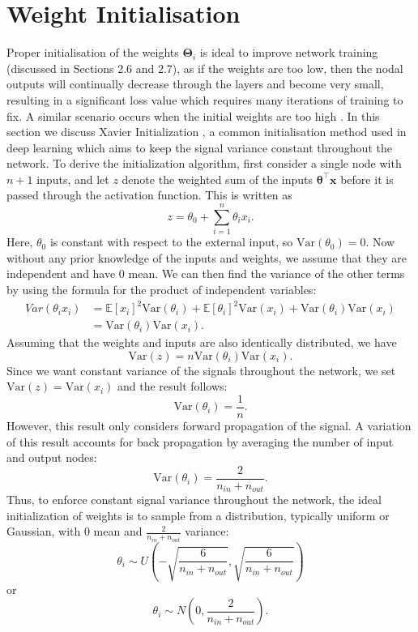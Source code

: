 \documentclass[honours,12pt]{unswthesis}
\newcommand{\E}{\mathbb{E}}
\newcommand{\Var}{\mathrm{Var}}
\numberwithin{equation}{section}
\theoremstyle{definition}
\begin{document}
\section{Weight Initialisation}
Proper initialisation of the weights $\bm{\Theta}_i$ is ideal to improve network training (discussed in Sections 2.6 and 2.7), as if the weights are too low, then the nodal outputs will continually decrease through the layers and become very small, resulting in a significant loss value which requires many iterations of training to fix. A similar scenario occurs when the initial weights are too high \citep{bishop}. In this section we discuss Xavier Initialization \citep{xavier}, a common initialisation method used in deep learning which aims to keep the signal variance constant throughout the network. To derive the initialization algorithm, first consider a single node with $n+1$ inputs, and let $z$ denote the weighted sum of the inputs $\bm{\theta}^\top\bm{x}$ before it is passed through the activation function. This is written as
\[z=\theta_0+\sum^n_{i=1}\theta_ix_i.\]
Here, $\theta_0$ is constant with respect to the external input, so $\Var(\theta_0)=0$. Now without any prior knowledge of the inputs and weights, we assume that they are independent and have 0 mean. We can then find the variance of the other terms by using the formula for the product of independent variables\citep{goodman}:
\begin{align*}
Var(\theta_ix_i)&=\E[x_i]^2\Var(\theta_i)+\E[\theta_i]^2\Var(x_i)+\Var(\theta_i)\Var(x_i)\\
&=\Var(\theta_i)\Var(x_i).
\end{align*}
Assuming that the weights and inputs are also identically distributed, we have
\[\Var(z)=n\Var(\theta_i)\Var(x_i).\]
Since we want constant variance of the signals throughout the network, we set $\Var(z)=\Var(x_i)$ and the result follows:
\[\Var(\theta_i)=\frac1n.\]
However, this result only considers forward propagation of the signal. A variation of this result accounts for back propagation by averaging the number of input and output nodes:
\[\Var(\theta_i)=\frac{2}{n_{in}+n_{out}}.\]
Thus, to enforce constant signal variance throughout the network, the ideal initialization of weights is to sample from a distribution, typically uniform or Gaussian, with $0$ mean and $\frac{2}{n_{in}+n_{out}}$ variance:
\[\theta_i\sim U\left(-\sqrt{\frac{6}{n_{in}+n_{out}}},\sqrt{\frac{6}{n_{in}+n_{out}}}\right)\]
or
\[\theta_i\sim N\left(0,\frac{2}{n_{in}+n_{out}}\right).\]
\end{document}
